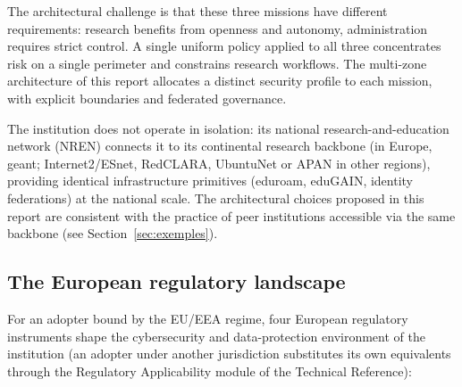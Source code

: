\noindent The architectural challenge is that these three
missions have different requirements: research benefits from
openness and autonomy, administration requires strict control. A
single uniform policy applied to all three concentrates risk on a
single perimeter and constrains research workflows. The
multi-zone architecture of this report allocates a distinct
security profile to each mission, with explicit boundaries and
federated governance.

The institution does not operate in isolation: its national
research-and-education network (NREN)
connects it to its continental research backbone (in Europe,
\gls{geant}; Internet2/ESnet, RedCLARA, UbuntuNet or APAN in other
regions),
providing identical infrastructure primitives (eduroam, eduGAIN,
identity federations) at the national scale. The architectural
choices proposed in this report are consistent with the practice
of peer institutions accessible via the same backbone (see
Section~\ref{sec:exemples}).

\subsection{The European regulatory landscape}

For an adopter bound by the EU/EEA regime, four European regulatory
instruments shape the cybersecurity and data-protection environment
of the institution (an adopter under another jurisdiction
substitutes its own equivalents through the Regulatory Applicability
module of the Technical Reference):

